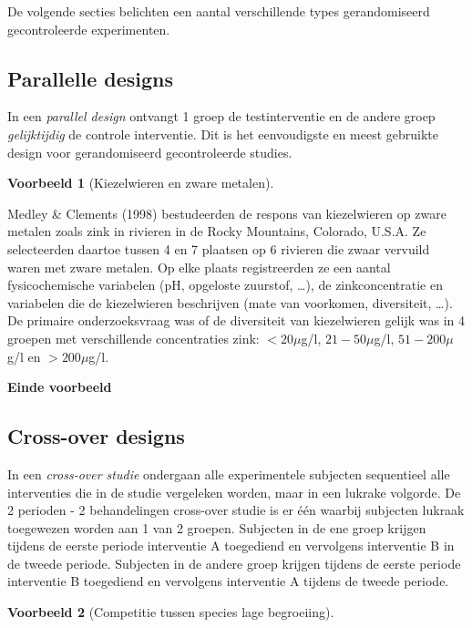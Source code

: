 \documentclass[
  12pt,dutch]{book}
\theoremstyle{definition}
\theoremstyle{definition}
\newtheorem{example}{Voorbeeld}[chapter]
\theoremstyle{definition}
\theoremstyle{definition}
\theoremstyle{remark}
\begin{document}
De volgende secties belichten een aantal verschillende types gerandomiseerd
gecontroleerde experimenten.

\subsection{Parallelle designs}\label{parallelle-designs}

In een \emph{parallel design} ontvangt 1 groep de testinterventie en de
andere groep \emph{gelijktijdig} de controle interventie. Dit is het
eenvoudigste en meest gebruikte design voor gerandomiseerd gecontroleerde
studies.

\begin{example}[Kiezelwieren en zware metalen]
\protect\hypertarget{exm:unnamed-chunk-75}{}\label{exm:unnamed-chunk-75}~
\end{example}

Medley \& Clements (1998) bestudeerden de respons van kiezelwieren
op zware metalen zoals zink in rivieren in de Rocky Mountains, Colorado, U.S.A.
Ze selecteerden daartoe tussen 4 en 7 plaatsen op 6 rivieren die zwaar vervuild
waren met zware metalen. Op elke plaats registreerden ze een aantal fysicochemische
variabelen (pH, opgeloste zuurstof, \ldots), de zinkconcentratie en variabelen die de
kiezelwieren beschrijven (mate van voorkomen, diversiteit, \ldots).
De primaire onderzoeksvraag was of de diversiteit van kiezelwieren gelijk was in
4 groepen met verschillende concentraties zink:
\(<20 \mu\)g/l, \(21-50 \mu\)g/l, \(51-200 \mu\)g/l en \(>200 \mu\)g/l.

\textbf{Einde voorbeeld}

\subsection{Cross-over designs}\label{cross-over-designs}

In een \emph{cross-over studie} ondergaan alle experimentele subjecten sequentieel alle
interventies die in de studie vergeleken worden, maar in een lukrake
volgorde. De 2 perioden - 2 behandelingen cross-over studie is er één
waarbij subjecten lukraak toegewezen worden aan 1 van 2 groepen.
Subjecten in de ene groep krijgen tijdens de eerste periode interventie A
toegediend en vervolgens interventie B in de tweede periode. Subjecten in
de andere groep krijgen tijdens de eerste periode interventie B toegediend
en vervolgens interventie A tijdens de tweede periode.

\begin{example}[Competitie tussen species lage begroeiing]
\protect\hypertarget{exm:unnamed-chunk-76}{}\label{exm:unnamed-chunk-76}~
\end{example}
\end{document}
